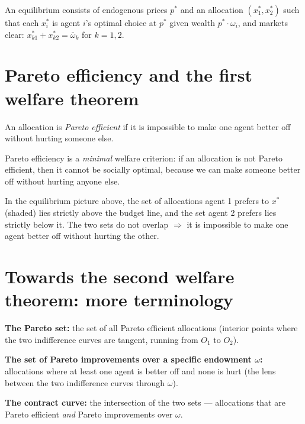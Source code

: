 \documentclass[11pt]{article}
\begin{document}
An equilibrium consists of endogenous prices $p^*$ and an allocation $(x_1^*,x_2^*)$ such
that each $x_i^*$ is agent $i$'s optimal choice at $p^*$ given wealth $p^*\cdot\omega_i$,
and markets clear: $x_{k1}^*+x_{k2}^*=\bar\omega_k$ for $k=1,2$.


\section{Pareto efficiency and the first welfare theorem}

An allocation is \emph{Pareto efficient} if it is impossible to make one agent better off
without hurting someone else.

Pareto efficiency is a \emph{minimal} welfare criterion: if an allocation is not Pareto
efficient, then it cannot be socially optimal, because we can make someone better off
without hurting anyone else.

In the equilibrium picture above, the set of allocations agent 1 prefers to $x^*$ (shaded)
lies strictly above the budget line, and the set agent 2 prefers lies strictly below it.
The two sets do not overlap $\Rightarrow$ it is impossible to make one agent better off
without hurting the other.

\begin{center}
\end{center}


\section{Towards the second welfare theorem: more terminology}

\begin{flatlist}
  \item \textbf{The Pareto set:} the set of all Pareto efficient allocations (interior
        points where the two indifference curves are tangent, running from $O_1$ to $O_2$).
  \item \textbf{The set of Pareto improvements over a specific endowment $\omega$:}
        allocations where at least one agent is better off and none is hurt (the lens
        between the two indifference curves through $\omega$).
  \item \textbf{The contract curve:} the intersection of the two sets --- allocations
        that are Pareto efficient \emph{and} Pareto improvements over $\omega$.
\end{flatlist}
\end{document}
